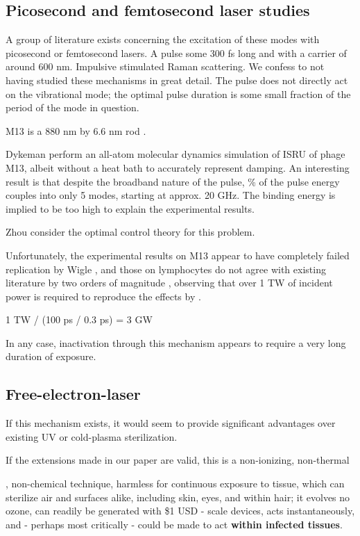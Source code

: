 \documentclass[paper.tex]{subfiles}
\begin{document}
\begin{multicols}{1}
\subsection{Picosecond and femtosecond laser studies}

A group of literature exists concerning the excitation of these modes with picosecond or femtosecond lasers. A pulse some 300 fs long and with a carrier of around 600 nm. Impulsive stimulated Raman scattering. We confess to not having studied these mechanisms in great detail. The pulse does not directly act on the vibrational mode; the optimal pulse duration is some small fraction of the period of the mode in question.

M13 is a 880 nm by 6.6 nm rod \cite{M132015}. 

Dykeman \cite{Vibrational2009} perform an all-atom molecular dynamics simulation of ISRU of phage M13, albeit without a heat bath to accurately represent damping. An interesting result is that despite the broadband nature of the pulse, \% of the pulse energy couples into only 5 modes, starting at approx. 20 GHz. The binding energy is implied to be too high to explain the experimental results. 

Zhou \cite{Maximum2010} consider the optimal control theory for this problem. 

Unfortunately, the experimental results on M13 appear to have completely failed replication by Wigle \cite{No2011}, and those on lymphocytes do not agree with existing literature by two orders of magnitude \cite{Targeted2002}, observing that over 1 TW of incident power is required to reproduce the effects by . 

1 TW / (100 ps / 0.3 ps) = 3 GW 

In any case, inactivation through this mechanism appears to require a very long duration of exposure.




\subsection{Free-electron-laser }


If this mechanism exists, it would seem to provide significant advantages over existing UV or cold-plasma sterilization. 

If the extensions made in our paper are valid, this is a non-ionizing, non-thermal

, non-chemical technique, harmless for continuous exposure to tissue, which can sterilize air and surfaces alike, including skin, eyes, and within hair; it evolves no ozone, can readily be generated with \$1 USD - scale devices, acts instantaneously, and - perhaps most critically - could be made to act {\bf within infected tissues}.





\end{multicols}
\end{document}
